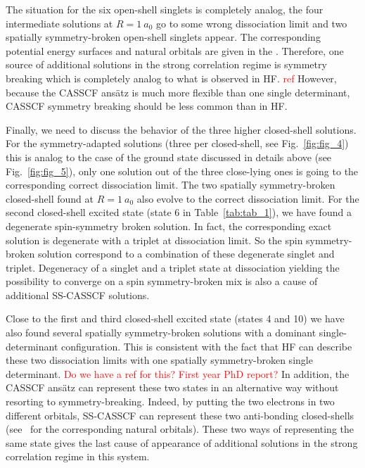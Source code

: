 \documentclass[aps,prb,reprint,showkeys,superscriptaddress]{revtex4-1}
\newcommand{\todo}[1]{\textcolor{red}{#1}}
\begin{document}
The situation for the six open-shell singlets is completely analog, \ie the four intermediate solutions at $R=1~a_0$ go to some wrong dissociation limit and two spatially symmetry-broken open-shell singlets appear.
The corresponding potential energy surfaces and natural orbitals are given in the \SupInf.
Therefore, one source of additional solutions in the strong correlation regime is symmetry breaking which is completely analog to what is observed in HF. \todo{ref}
However, because the CASSCF ans\"atz is much more flexible than one single determinant, CASSCF symmetry breaking should be less common than in HF.

Finally, we need to discuss the behavior of the three higher closed-shell solutions.
For the symmetry-adapted solutions (three per closed-shell, see Fig.~\ref{fig:fig_4}) this is analog to the case of the ground state discussed in details above (see Fig.~\ref{fig:fig_5}), \ie only one solution out of the three close-lying ones is going to the corresponding correct dissociation limit.
The two spatially symmetry-broken closed-shell found at $R=1~a_0$ also evolve to the correct dissociation limit.
For the second closed-shell excited state (state 6 in Table~\ref{tab:tab_1}), we have found a degenerate spin-symmetry broken solution.
In fact, the corresponding exact solution is degenerate with a triplet at dissociation limit.
So the spin symmetry-broken solution correspond to a combination of these degenerate singlet and triplet.
Degeneracy of a singlet and a triplet state at dissociation yielding the possibility to converge on a spin symmetry-broken mix is also a cause of additional SS-CASSCF solutions.

Close to the first and third closed-shell excited state (states 4 and 10) we have also found several spatially symmetry-broken solutions with a dominant single-determinant configuration.
This is consistent with the fact that HF can describe these two dissociation limits with one spatially symmetry-broken single determinant. \todo{Do we have a ref for this? First year PhD report?}
In addition, the CASSCF ans\"atz can represent these two states in an alternative way without resorting to symmetry-breaking.
Indeed, by putting the two electrons in two different orbitals, SS-CASSCF can represent these two anti-bonding closed-shells (see \SupInf~for the corresponding natural orbitals).
These two ways of representing the same state gives the last cause of appearance of additional solutions in the strong correlation regime in this system.

\end{document}
